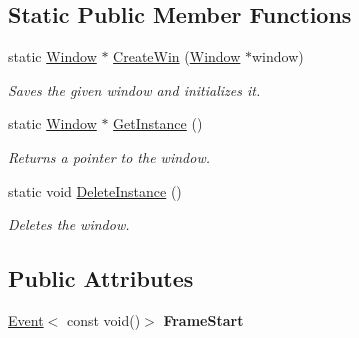 \subsection*{Static Public Member Functions}
\begin{DoxyCompactItemize}
\item 
static \hyperlink{class_ensum_1_1_core_1_1_window}{Window} $\ast$ \hyperlink{class_ensum_1_1_core_1_1_window_af9478f4a6643763ba3be7a1a9fc98377}{Create\+Win} (\hyperlink{class_ensum_1_1_core_1_1_window}{Window} $\ast$window)\hypertarget{class_ensum_1_1_core_1_1_window_af9478f4a6643763ba3be7a1a9fc98377}{}\label{class_ensum_1_1_core_1_1_window_af9478f4a6643763ba3be7a1a9fc98377}

\begin{DoxyCompactList}\small\item\em Saves the given window and initializes it. \end{DoxyCompactList}\item 
static \hyperlink{class_ensum_1_1_core_1_1_window}{Window} $\ast$ \hyperlink{class_ensum_1_1_core_1_1_window_ada827fab647cc63b1c389f91f670bf18}{Get\+Instance} ()\hypertarget{class_ensum_1_1_core_1_1_window_ada827fab647cc63b1c389f91f670bf18}{}\label{class_ensum_1_1_core_1_1_window_ada827fab647cc63b1c389f91f670bf18}

\begin{DoxyCompactList}\small\item\em Returns a pointer to the window. \end{DoxyCompactList}\item 
static void \hyperlink{class_ensum_1_1_core_1_1_window_ac6e8b05158fca2587cdfe23dabf35baf}{Delete\+Instance} ()
\begin{DoxyCompactList}\small\item\em Deletes the window. \end{DoxyCompactList}\end{DoxyCompactItemize}
\subsection*{Public Attributes}
\begin{DoxyCompactItemize}
\item 
\hyperlink{class_ensum_1_1_event}{Event}$<$ const void()$>$ {\bfseries Frame\+Start}\hypertarget{class_ensum_1_1_core_1_1_window_a79041673278295fc966640f88d40c743}{}\label{class_ensum_1_1_core_1_1_window_a79041673278295fc966640f88d40c743}

\end{DoxyCompactItemize}
